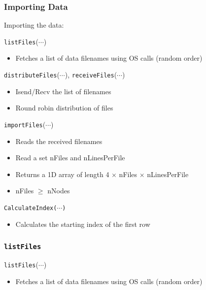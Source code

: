\documentclass[usernames,dvipsnames]{beamer}
\begin{document}
\begin{frame}
	\frametitle{Importing Data}
	
    	\begin{block}{Importing the data:}
	    	
    		\texttt{listFiles}($\cdots$)
    		\begin{itemize}
    			\item Fetches a list of data filenames using OS calls (random order)
    		\end{itemize}
    		
    		\texttt{distributeFiles}($\cdots$), \texttt{receiveFiles}($\cdots$)
    		\begin{itemize}
    			\item Isend/Recv the list of filenames
    			\item Round robin distribution of files
    		\end{itemize}
    		
    		\texttt{importFiles}($\cdots$)
    		\begin{itemize}
    			\item Reads the received filenames
    			\item Read a set nFiles and nLinesPerFile
    			\item Returns a 1D array of length 4 $\times$ nFiles $\times$ nLinesPerFile
    			\item nFiles $\ge$ nNodes
    		\end{itemize}
    		
    		\texttt{CalculateIndex($\cdots$)}
    		    \begin{itemize}
    		        \item Calculates the starting index of the first row
    		    \end{itemize}
    	\end{block}
		
\end{frame}


\begin{frame}
	\frametitle{\texttt{listFiles}}
	
    		\texttt{listFiles}($\cdots$)
    		\begin{itemize}
    			\item Fetches a list of data filenames using OS calls (random order)
    		\end{itemize}
    		

\end{frame}
\end{document}
